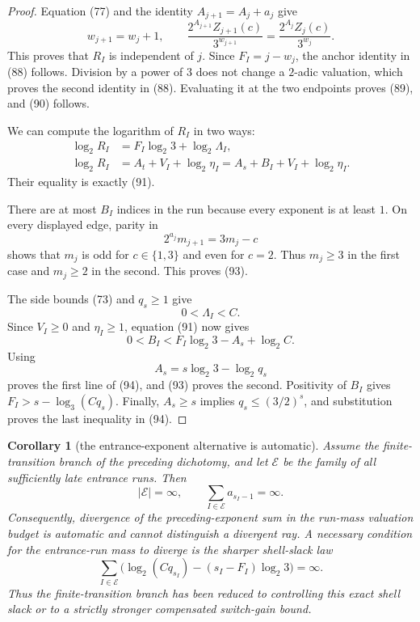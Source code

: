 \documentclass[11pt]{article}
\newtheorem{corollary}[theorem]{Corollary}
\begin{document}
\begin{proof}
Equation (77) and the identity $A_{j+1}=A_j+a_j$ give
\[
  w_{j+1}=w_j+1,
  \qquad
  \frac{2^{A_{j+1}}Z_{j+1}(c)}{3^{w_{j+1}}}
  =\frac{2^{A_j}Z_j(c)}{3^{w_j}}.
\]
This proves that $R_I$ is independent of $j$.  Since
$F_I=j-w_j$, the anchor identity in (88) follows.  Division by a power of
$3$ does not change a $2$-adic valuation, which proves the second identity
in (88).  Evaluating it at the two endpoints proves (89), and (90) follows.

We can compute the logarithm of $R_I$ in two ways:
\[
\begin{aligned}
  \log_2R_I
  &=F_I\log_2 3+\log_2\Lambda_I,\\
  \log_2R_I
  &=A_t+V_I+\log_2\eta_I
   =A_s+B_I+V_I+\log_2\eta_I.
\end{aligned}
\]
Their equality is exactly (91).

There are at most $B_I$ indices in the run because every exponent is at
least $1$.  On every displayed edge, parity in
\[
  2^{a_j}m_{j+1}=3m_j-c
\]
shows that $m_j$ is odd for $c\in\{1,3\}$ and even for $c=2$.
Thus $m_j\geq3$ in the first case and $m_j\geq2$ in the second.  This proves
(93).

The side bounds (73) and $q_s\geq1$ give
\[
  0<\Lambda_I<C.
\]
Since $V_I\geq0$ and $\eta_I\geq1$, equation (91) now gives
\[
  0<B_I
  <F_I\log_2 3-A_s+\log_2C.
\]
Using
\[
  A_s=s\log_2 3-\log_2q_s
\]
proves the first line of (94), and (93) proves the second.  Positivity of
$B_I$ gives $F_I>s-\log_3(Cq_s)$.  Finally,
$A_s\geq s$ implies $q_s\leq(3/2)^s$, and substitution proves the last
inequality in (94).
\end{proof}

\begin{corollary}[the entrance-exponent alternative is automatic]
Assume the finite-transition branch of the preceding dichotomy, and let
$\mathcal E$ be the family of all sufficiently late entrance runs.  Then
\[
  |\mathcal E|=\infty,
  \qquad
  \sum_{I\in\mathcal E}a_{s_I-1}=\infty.
  \tag{95}
\]
Consequently, divergence of the preceding-exponent sum in the run-mass
valuation budget is automatic and cannot distinguish a divergent ray.  A
necessary condition for the entrance-run mass to diverge is the sharper
shell-slack law
\[
\boxed{
  \sum_{I\in\mathcal E}
  \bigl(\log_2(Cq_{s_I})
       -(s_I-F_I)\log_2 3\bigr)=\infty.}
\tag{96}
\]
Thus the finite-transition branch has been reduced to controlling this
exact shell slack or to a strictly stronger compensated switch-gain bound.
\end{corollary}
\end{document}

